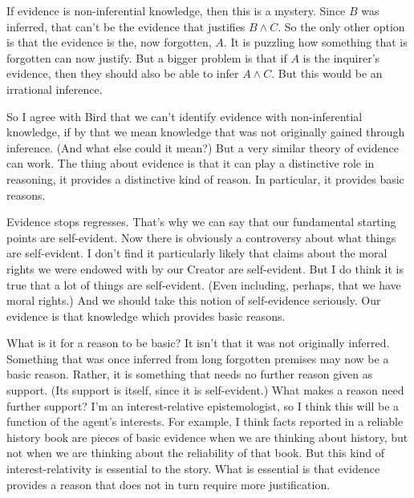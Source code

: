 \documentclass[11pt,]{book}
\begin{document}
If evidence is non-inferential knowledge, then this is a mystery. Since \(B\) was inferred, that can't be the evidence that justifies \(B \wedge C\). So the only other option is that the evidence is the, now forgotten, \(A\). It is puzzling how something that is forgotten can now justify. But a bigger problem is that if \(A\) is the inquirer's evidence, then they should also be able to infer \(A \wedge C\). But this would be an irrational inference.

So I agree with Bird that we can't identify evidence with non-inferential knowledge, if by that we mean knowledge that was not originally gained through inference. (And what else could it mean?) But a very similar theory of evidence can work. The thing about evidence is that it can play a distinctive role in reasoning, it provides a distinctive kind of reason. In particular, it provides basic reasons.

Evidence stops regresses. That's why we can say that our fundamental starting points are self-evident. Now there is obviously a controversy about what things are self-evident. I don't find it particularly likely that claims about the moral rights we were endowed with by our Creator are self-evident. But I do think it is true that a lot of things are self-evident. (Even including, perhaps, that we have moral rights.) And we should take this notion of self-evidence seriously. Our evidence is that knowledge which provides basic reasons.

What is it for a reason to be basic? It isn't that it was not originally inferred. Something that was once inferred from long forgotten premises may now be a basic reason. Rather, it is something that needs no further reason given as support. (Its support is itself, since it is self-evident.) What makes a reason need further support? I'm an interest-relative epistemologist, so I think this will be a function of the agent's interests. For example, I think facts reported in a reliable history book are pieces of basic evidence when we are thinking about history, but not when we are thinking about the reliability of that book. But this kind of interest-relativity is essential to the story. What is essential is that evidence provides a reason that does not in turn require more justification.
\end{document}

